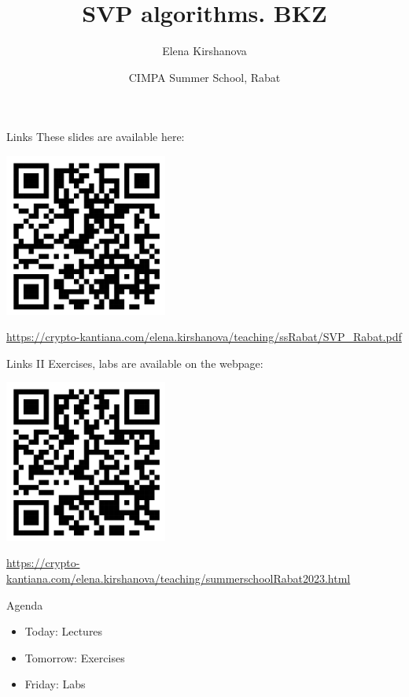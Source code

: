 \documentclass[usenames,dvipsnames, 9pt, aspectratio=169]{beamer}
\institute{\Large Technology Innovation Institute, Abu Dhabi, UAE}
\author{Elena Kirshanova \\ [10pt]
}
\title{SVP algorithms. BKZ}
\date{CIMPA Summer School, Rabat}
\begin{document}
	
\begin{frame}
	\titlepage
\end{frame}



\begin{frame}{Links}
	\Large 
	\centering
	These slides are available here: 
	\vspace{7pt}
	
	\includegraphics[width=0.4\textwidth]{qrcodeSlides}
	
	\vspace{5pt}
	\url{https://crypto-kantiana.com/elena.kirshanova/teaching/ssRabat/SVP_Rabat.pdf}
\end{frame}

\begin{frame}{Links II}
\centering
	\Large Exercises, labs are available on the webpage:
	\vspace{7pt}
	
	\includegraphics[width=0.4\textwidth]{qrcodeWebpage}
	
	\vspace{5pt}
	\url{https://crypto-kantiana.com/elena.kirshanova/teaching/summerschoolRabat2023.html}
\end{frame}

\begin{frame}{Agenda}
\LARGE
\begin{itemize}
	\itemsep 10pt
	\item {\color{Orange} Today:} Lectures
	\item {\color{Orange} Tomorrow:} Exercises
	\item {\color{Orange} Friday:} Labs
\end{itemize}
\end{frame}
\end{document}
